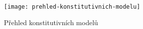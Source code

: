 
\begin{figure}[H]
	\centering
	\texttt{[image: prehled-konstitutivnich-modelu]}
	\caption{Přehled konstitutivních modelů}
	\label{fig:prehled-konstitutivnich-modelu}
\end{figure}
